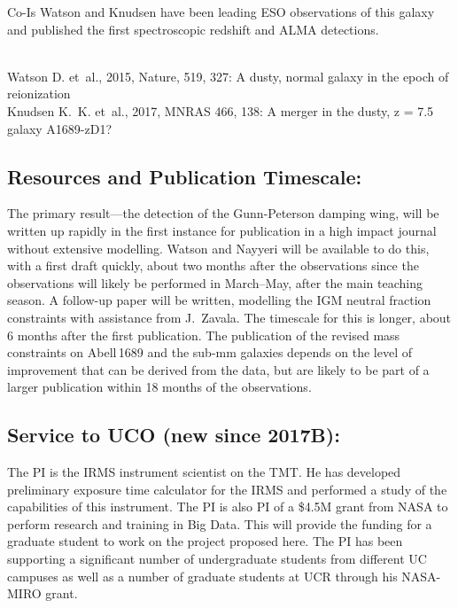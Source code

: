 \documentclass[letter,12pt]{article}
\begin{document}
Co-Is Watson and Knudsen have been leading ESO observations of this galaxy and
published the first spectroscopic redshift and ALMA detections.

\noindent \smallskip\\
Watson D. et~al., 2015, Nature, 519, 327: A dusty, normal galaxy in the epoch of reionization
\smallskip\\
Knudsen K.~K. et~al., 2017, MNRAS 466, 138: A merger in the dusty, z = 7.5 galaxy A1689-zD1?

\subsection{Resources and Publication Timescale:}

The primary result---the detection of the Gunn-Peterson damping wing, will be
written up rapidly in the first instance for publication in a high impact
journal without extensive modelling. Watson and Nayyeri will be available to do
this, with a first draft quickly, about two months after the observations since
the observations will likely be performed in March--May, after the main teaching
season. A follow-up paper will be written, modelling the IGM neutral fraction
constraints with assistance from J.~Zavala. The timescale for this is longer,
about 6 months after the first publication. The publication of the revised mass
constraints on Abell\,1689 and the sub-mm galaxies depends on the level of
improvement that can be derived from the data, but are likely to be part of a
larger publication within 18 months of the observations.

\subsection{Service to UCO (new since 2017B):}
The PI is the IRMS instrument scientist on the TMT. He has developed
preliminary exposure time calculator for the IRMS and performed a
study of the capabilities of this instrument. The PI is also PI of a
\$4.5M grant from NASA to perform research and training in Big Data.
This will provide the funding for a graduate student to work on the
project proposed here. The PI has been supporting a significant number
of undergraduate students from different UC campuses as well as a
number of graduate students at UCR through his NASA-MIRO grant.
\end{document}
